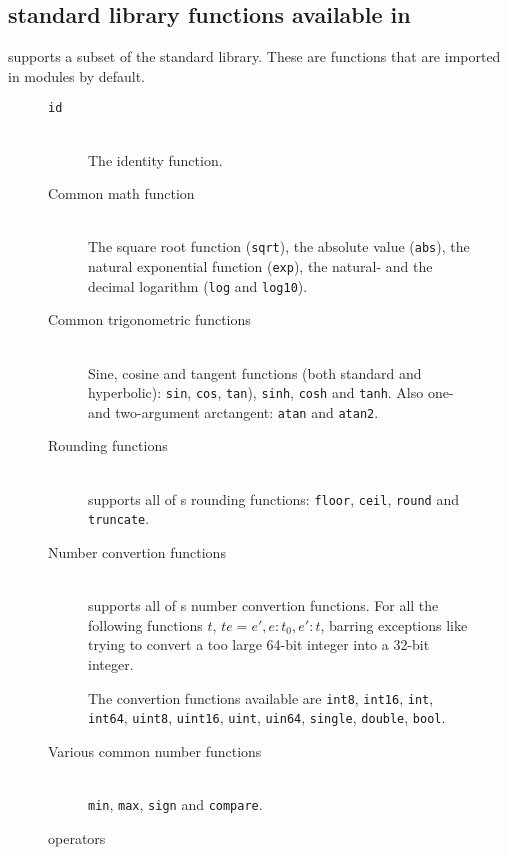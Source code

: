 \subsection*{\fsharp{} standard library functions available in \fshark{}}
\fshark{} supports a subset of the \fsharp{} standard library. These are
functions that are imported in \fsharp{} modules by default.

\begin{figure}[h]
  \centering
\begin{description}
\item[\texttt{id}]\hfill\\
  The identity function.

\item[Common math function]\hfill\\
  The square root function (\texttt{sqrt}), the absolute value (\texttt{abs}),
  the natural exponential function (\texttt{exp}), the natural- and the decimal
  logarithm (\texttt{log} and \texttt{log10}).
  
\item[Common trigonometric functions]\hfill\\
  Sine, cosine and tangent functions (both standard and hyperbolic):
  \texttt{sin}, \texttt{cos}, \texttt{tan}), \texttt{sinh}, \texttt{cosh} and \texttt{tanh}.
  Also one- and two-argument arctangent: \texttt{atan} and \texttt{atan2}.

\item[Rounding functions]\hfill\\
  \fshark{} supports all of \fsharp{}s rounding functions:
  \texttt{floor}, \texttt{ceil}, \texttt{round} and \texttt{truncate}.
  
\item[Number convertion functions]\hfill\\
  \fshark{} supports all of \fsharp{}s number convertion functions.
  For all the following functions $t$, $t e = e', e : t_0, e' : t$, barring
  exceptions like trying to convert a too large 64-bit integer into a 32-bit
  integer.

  The convertion functions available are \texttt{int8}, \texttt{int16}, \texttt{int}, \texttt{int64}, \texttt{uint8}, \texttt{uint16},
  \texttt{uint}, \texttt{uin64}, \texttt{single}, \texttt{double}, \texttt{bool}.
  
\item[Various common number functions]\hfill\\
  \texttt{min}, \texttt{max}, \texttt{sign} and \texttt{compare}.
\end{description}
  \caption{\fshark{} operators}
  \label{fig:fsharkfuns}
\end{figure}

